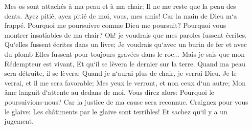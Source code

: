 \verse Mes os sont attachés à ma peau et à ma chair; Il ne me reste que la peau des dents. 
\verse Ayez pitié, ayez pitié de moi, vous, mes amis! Car la main de Dieu m`a frappé. 
\verse Pourquoi me poursuivre comme Dieu me poursuit? Pourquoi vous montrer insatiables de ma chair? 
\verse Oh! je voudrais que mes paroles fussent écrites, Qu`elles fussent écrites dans un livre; 
\verse Je voudrais qu`avec un burin de fer et avec du plomb Elles fussent pour toujours gravées dans le roc... 
\verse Mais je sais que mon Rédempteur est vivant, Et qu`il se lèvera le dernier sur la terre. 
\verse Quand ma peau sera détruite, il se lèvera; Quand je n`aurai plus de chair, je verrai Dieu. 
\verse Je le verrai, et il me sera favorable; Mes yeux le verront, et non ceux d`un autre; Mon âme languit d`attente au dedans de moi. 
\verse Vous direz alors: Pourquoi le poursuivions-nous? Car la justice de ma cause sera reconnue. 
\verse Craignez pour vous le glaive: Les châtiments par le glaive sont terribles! Et sachez qu`il y a un jugement. 

